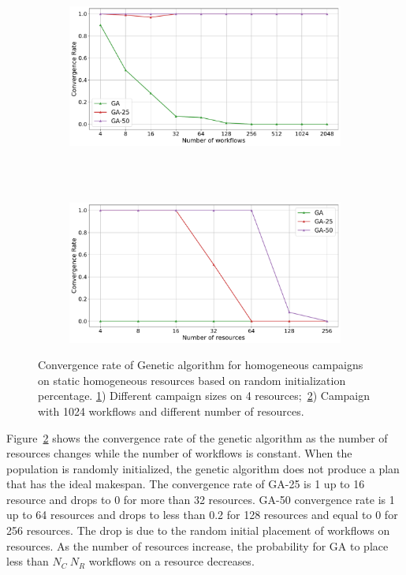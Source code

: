 \begin{figure}[ht!]
    \centering
    \begin{subfigure}[b]{0.75\textwidth}
        \includegraphics[width=.95\textwidth]{figures/campaign/StHomoCampaigns_4StHomoResourcesGAconv.pdf}
        \caption{}
        \label{fig:ga_conv1}
    \end{subfigure}\\
    ~
    \begin{subfigure}[b]{0.75\textwidth}
        \includegraphics[width=.95\textwidth]{figures/campaign/HomogeResources_StHomogeCampaignsGAconv.pdf}
        \caption{}
        \label{fig:ga_conv2}
    \end{subfigure}
    \caption{Convergence rate of Genetic algorithm for homogeneous campaigns on
    static homogeneous resources based on random initialization
    percentage. \ref{fig:ga_conv1}) Different campaign sizes on 4
    resources;~\ref{fig:ga_conv2}) Campaign with 1024 workflows and different
    number of resources.}
    \label{fig:conv_rate}
\end{figure}

Figure~\ref{fig:ga_conv2} shows the convergence rate of the genetic algorithm as
the number of resources changes while the number of workflows is constant. When
the population is randomly initialized, the genetic algorithm does not produce a
plan that has the ideal makespan. The convergence rate of GA-25 is 1 up to 16
resource and drops to 0 for more than 32 resources. GA-50 convergence rate is 1
up to 64 resources and drops to less than 0.2 for 128 resources and equal to 0
for 256 resources. The drop is due to the random initial placement of workflows
on resources. As the number of resources increase, the probability for GA to
place less than $N_{C} \ N_{R}$ workflows on a resource decreases.

